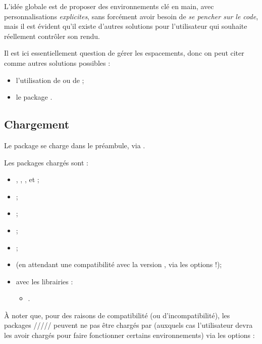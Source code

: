 \documentclass[french,11pt,a4paper]{article}
\begin{document}
\smallskip

L'idée globale est de proposer des environnements clé en main, avec personnalisations \textit{explicites}, sans forcément avoir besoin de \textit{se pencher sur le code}, mais il est évident qu'il existe d'autres solutions pour l'utilisateur qui souhaite réellement contrôler son rendu.

\smallskip

Il est ici essentiellement question de gérer les espacements, donc on peut citer comme autres solutions possibles :

\begin{itemize}
	\item l'utilisation de  ou de  ;
	\item le package .
\end{itemize}

\subsection{Chargement}

Le package se charge dans le préambule, via .

Les packages chargés sont :

\begin{itemize}
	\item {}, , ,  et  ;
	\item {} ;
	\item {} ;
	\item {} ;
	\item {} ;
	\item {} (en attendant une compatibilité avec la version , via les options \MontreCode{[fa6] / [fa5fa6]} !);
	\item {} avec les librairies :
	\begin{itemize}
		\item {}.
	\end{itemize}
\end{itemize}

À noter que, pour des raisons de compatibilité (ou d'incompatibilité), les packages ///// peuvent ne pas être chargés par  (auxquels cas l'utilisateur devra les avoir chargés pour faire fonctionner certains environnements) via les options :
\end{document}
